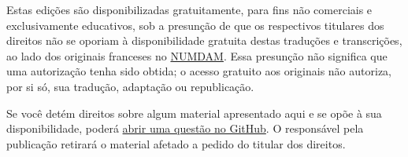 \documentclass[11pt,twoside,openany]{book}
\newcommand{\FgaUnitKey}{frontmatter}
\begin{document}
Estas edições são disponibilizadas gratuitamente, para fins não comerciais e exclusivamente educativos, sob a presunção de que os respectivos titulares dos direitos não se oporiam à disponibilidade gratuita destas traduções e transcrições, ao lado dos originais franceses no \href{https://www.numdam.org/}{NUMDAM}. Essa presunção não significa que uma autorização tenha sido obtida; o acesso gratuito aos originais não autoriza, por si só, sua tradução, adaptação ou republicação.

Se você detém direitos sobre algum material apresentado aqui e se opõe à sua disponibilidade, poderá \href{https://github.com/KokunoYumeto/ega-fga-sga-pt-br/issues}{abrir uma questão no GitHub}. O responsável pela publicação retirará o material afetado a pedido do titular dos direitos.


\tableofcontents
\mainmatter
\def\FgaUnitKey{149}
\def\FgaUnitKey{e149}
\def\FgaUnitKey{182}
\def\FgaUnitKey{e182}
\def\FgaUnitKey{190}
\def\FgaUnitKey{e190}
\def\FgaUnitKey{195}
\def\FgaUnitKey{e195}
\end{document}

